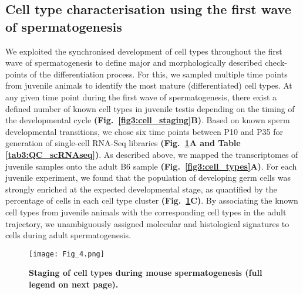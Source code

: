 \subsection{Cell type characterisation using the first wave of spermatogenesis}
 
We exploited the synchronised development of cell types throughout the first wave of spermatogenesis to define major and morphologically described check-points of the differentiation process. 
For this, we sampled multiple time points from juvenile animals to identify the most mature (differentiated) cell types. 
At any given time point during the first wave of spermatogenesis, there exist a defined number of known cell types in juvenile testis depending on the timing of the developmental cycle \textbf{(Fig.~\ref{fig3:cell_staging}B)}. 
Based on known sperm developmental transitions, we chose six time points between P10 and P35 for generation of single-cell RNA-Seq libraries \textbf{(Fig.~\ref{fig3:1st_wave}A and Table \ref{tab3:QC_scRNAseq})}. 
As described above, we mapped the transcriptomes of juvenile samples onto the adult B6 sample \textbf{(Fig.~\ref{fig3:cell_types}A)}. 
For each juvenile experiment, we found that the population of developing germ cells was strongly enriched at the expected developmental stage, as quantified by the percentage of cells in each cell type cluster \textbf{(Fig.~\ref{fig3:1st_wave}C)}. 
By associating the known cell types from juvenile animals with the corresponding cell types in the adult trajectory, we unambiguously assigned molecular and histological signatures to cells during adult spermatogenesis.

\newpage

\begin{figure}[!h]
\centering
\texttt{[image: Fig\_4.png]}
\caption[Staging of cell types during mouse spermatogenesis]{\textbf{Staging of cell types during mouse spermatogenesis (full legend on next page).}}
\label{fig3:1st_wave}
\end{figure}

\newpage

